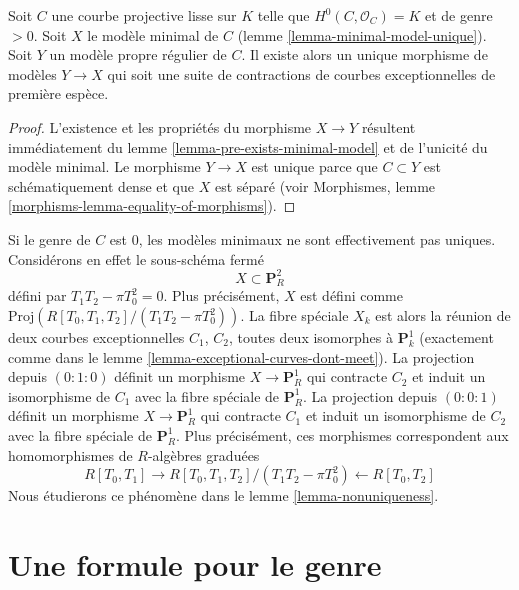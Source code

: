 \begin{lemma}
\label{lemma-minimal-model-mapping-property}
Soit $C$ une courbe projective lisse sur $K$ telle que $H^0(C, \mathcal{O}_C) = K$
et de genre $> 0$. Soit $X$ le modèle minimal de $C$
(lemme \ref{lemma-minimal-model-unique}).
Soit $Y$ un modèle propre régulier de $C$. Il existe alors un unique
morphisme de modèles $Y \to X$ qui soit une suite de contractions de
courbes exceptionnelles de première espèce.
\end{lemma}

\begin{proof}
L'existence et les propriétés du morphisme $X \to Y$
résultent immédiatement du lemme \ref{lemma-pre-exists-minimal-model}
et de l'unicité du modèle minimal.
Le morphisme $Y \to X$ est unique parce que
$C \subset Y$ est schématiquement dense et que $X$ est séparé
(voir Morphismes, lemme \ref{morphisms-lemma-equality-of-morphisms}).
\end{proof}

\begin{example}
\label{example-nonunique-in-genus-zero}
Si le genre de $C$ est $0$, les modèles minimaux ne sont effectivement pas uniques.
Considérons en effet le sous-schéma fermé
$$
X \subset \mathbf{P}^2_R
$$
défini par $T_1T_2 - \pi T_0^2 = 0$. Plus précisément, $X$ est défini
comme $\text{Proj}(R[T_0, T_1, T_2]/(T_1T_2 - \pi T_0^2))$. La
fibre spéciale $X_k$ est alors la réunion de deux courbes exceptionnelles $C_1$, $C_2$, toutes deux
isomorphes à $\mathbf{P}^1_k$
(exactement comme dans le lemme \ref{lemma-exceptional-curves-dont-meet}).
La projection depuis $(0 : 1 : 0)$ définit un morphisme $X \to \mathbf{P}^1_R$
qui contracte $C_2$ et induit un isomorphisme de $C_1$ avec la fibre spéciale
de $\mathbf{P}^1_R$. La projection depuis $(0 : 0 : 1)$ définit un
morphisme $X \to \mathbf{P}^1_R$ qui contracte $C_1$ et induit un
isomorphisme de $C_2$ avec la fibre spéciale de $\mathbf{P}^1_R$.
Plus précisément, ces morphismes correspondent aux homomorphismes de $R$-algèbres
graduées
$$
R[T_0, T_1] \longrightarrow
R[T_0, T_1, T_2]/(T_1T_2 - \pi T_0^2) \longleftarrow
R[T_0, T_2]
$$
Nous étudierons ce phénomène dans le lemme \ref{lemma-nonuniqueness}.
\end{example}









\section{Une formule pour le genre}
\label{section-genus-formula}

